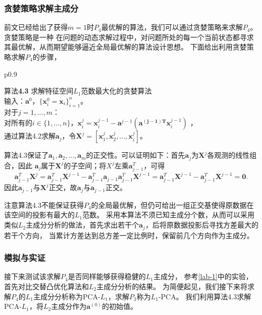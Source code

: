 \subsubsection{贪婪策略求解主成分}
前文已经给出了获得$m = 1$时$P_4$最优解的算法，我们可以通过贪婪策略来求解$P_4$。贪婪策略是一种
在问题的动态求解过程中，对问题所处的每一个当前状态都寻求其最优解，从而期望能够逼近全局最优解的算法设计思想。
下面给出利用贪婪策略求解$P_4$的步骤，
\begin{table}[H]%
    \centering%
    \begin{tabular}{{p{0.9\columnwidth}}}%
    
    \toprule%
    {\heiti 算法}{\bf 4.3} 求解特征空间$L_1$范数最大化的贪婪算法\\
    \midrule%
        输入：$\bm a^0$，$\{\bm x_i^0 = \bm x_i\}_{i=1}^n$。\\
        对于$j = 1, ..., m$： \\
        对所有的$i \in \{ 1, ..., n\}$，$\bm x_i^j = \bm x_i^{j-1} - \bm a^{j-1}(\bm {a^{(j-1)T}}\bm x_i^{j-1})$ ， \\
        通过算法4.2求解$\bm a_j$，令$\bm{X}^j = [\bm x_1^j, \bm x_2^j, ..., \bm x_i^j]$。 \\
    \bottomrule%
    \end{tabular}
\end{table}%
算法4.3保证了$\bm a_1, \bm a_2, ..., \bm a_m$的正交性。可以证明如下：首先$\bm a_j$为$\bm X^j$各观测的线性组合，因此
$\bm a_j$属于$\bm X^j$的子空间；将$X^j$左乘$\bm a_{j-1}^T$，可得
\begin{equation*}
    \bm a_{j-1}^T\bm X^j = \bm a_{j-1}^T \bm X^{j-1} - \bm a_{j-1}^T\bm a_{j-1}\bm a_{j-1}^T \bm X^{j-1}
    = \bm a_{j-1}^T\bm X^{j-1} - \bm a_{j-1}^T\bm X^{j-1} = \bm 0.
\end{equation*}
因此$\bm a_{j-1}$与$\bm X^j$正交，故$\bm a_j$与$\bm a_{j-1}$正交。

注意算法4.3不能保证获得$P_4$的全局最优解，但仍可给出一组正交基使得原数据在该空间的投影有最大的$L_1$范数。
采用本算法不须已知主成分个数，从而可以采用类似$L_2$主成分分析的做法，首先求出若干个$\bm a_j$，后将原数据投影后寻找方差最大的若干个方向，
当累计方差达到总方差一定比例时，保留前几个方向作为主成分。

\subsubsection{模拟与实证}
接下来测试该求解$P_4$是否同样能够获得稳健的$L_1$主成分，
参考\ref{lab-1}中的实验，首先对比交替凸优化算法和$L_2$主成分分析的结果。
为简便起见，我们接下来将求解$P_4$的$L_1$主成分分析称为PCA-$L_1$，求解$P_3$称为$L_1$-PCA。
我们利用算法4.3求解PCA-$L_1$，将$L_2$主成分作为$\bm a^{(0)}$的初始值。

